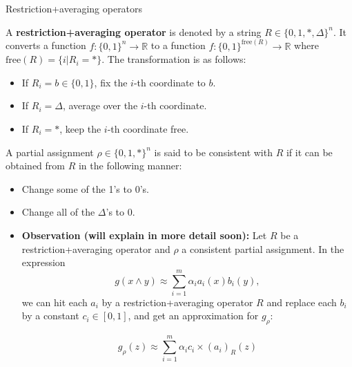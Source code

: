 \begin{frame}{Restriction+averaging operators}
	

	
	A \textbf{restriction+averaging operator} is denoted by a string $R \in \{0,1,*,\Delta\}^n$. It converts a function $f: \{0,1\}^n \rightarrow \mathbb{R}$ to a function $f: \{0,1\}^{\text{free}(R)} \rightarrow \mathbb{R}$ where $\text{free}(R)= \{i | R_i=*\}$. The transformation is as follows:
	\begin{itemize}
		\item If $R_i=b \in \{0,1\}$, fix the $i$-th coordinate to $b$.
		\item If $R_i= \Delta$, average over the $i$-th coordinate.
		\item If $R_i=*$, keep the $i$-th coordinate free.
	\end{itemize}
	
	A partial assignment $\rho \in \{0,1,*\}^n$ is said to be consistent with $R$ if it can be obtained from $R$ in the following manner:
	\begin{itemize}
		\item Change some of the 1's to 0's.
		\item Change all of the $\Delta$'s to 0.
	\end{itemize}
	
\end{frame}
\begin{frame}
	
	\begin{itemize}
		\item \textbf{Observation (will explain in more detail soon): }
		Let $R$ be a restriction+averaging operator and $\rho$ a consistent partial assignment. \newline
		In the expression 
		$$ g(x \land y) \approx \displaystyle \sum_{i=1}^{m} \alpha_i a_i(x)b_i(y),$$
		we can hit each $a_i$ by a restriction+averaging operator $R$ and replace each $b_i$ by a constant $c_i \in [0,1]$, and get an approximation for $g_{\rho}$:
		
		$$ g_{\rho}(z) \approx \displaystyle \sum_{i=1}^{m} \alpha_i c_i \times (a_i)_R(z)$$
	\end{itemize}
\end{frame}


